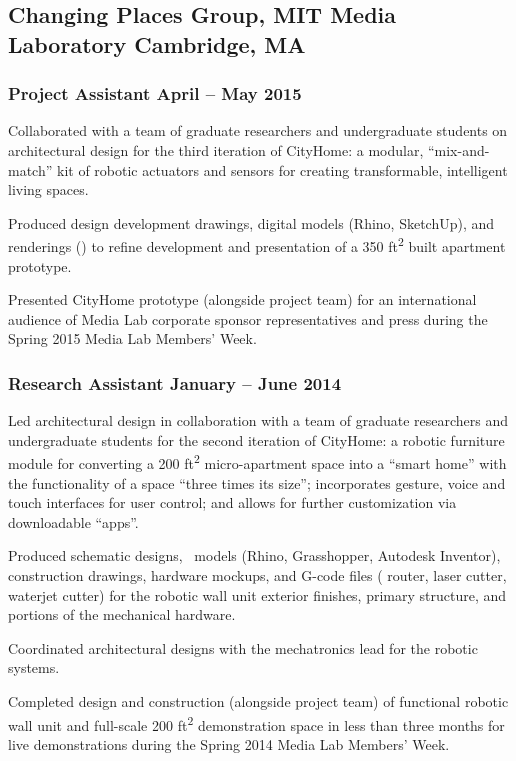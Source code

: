 \documentclass[letterpaper, oneside, 10pt]{article}
\begin{document}
\subsection*{Changing Places Group, MIT Media Laboratory\DotSep{0.25em} Cambridge, MA}

\subsubsection*{Project Assistant\DotSep{0.25em} April -- May 2015}

Collaborated with a team of graduate researchers and undergraduate
students on architectural design for the third iteration of CityHome: a
modular, ``mix-and-match'' kit of robotic actuators and sensors for
creating transformable, intelligent living spaces.

Produced design development drawings, digital models (Rhino, SketchUp),
and renderings (\kern-0.5pt) to refine development and
presentation of a 350 ft\textsuperscript{2} built apartment prototype.

Presented CityHome prototype (alongside project team) for an international
audience of Media Lab corporate sponsor representatives and press during
the Spring 2015  Media Lab Members’ Week.


\subsubsection*{Research Assistant\DotSep{0.25em} January -- June 2014}

Led architectural design in collaboration with a team of graduate
researchers and undergraduate students for the second iteration of
CityHome: a robotic furniture module for converting a 200
ft\textsuperscript{2} micro-apartment space into a ``smart home'' with the
functionality of a space ``three times its size''; incorporates gesture,
voice and touch interfaces for user control; and allows for further
customization via downloadable ``apps''.

Produced schematic designs, \ models (Rhino, Grasshopper, Autodesk
Inventor), construction drawings, hardware mockups, and G-code files
( router, laser cutter, waterjet cutter) for the robotic
wall unit exterior finishes, primary structure, and portions of the
mechanical hardware.

Coordinated architectural designs with the mechatronics lead for the
robotic systems.

Completed design and construction (alongside project team) of functional
robotic wall unit and full-scale 200 ft\textsuperscript{2} demonstration
space in less than three months for live demonstrations during the Spring
2014  Media Lab Members’ Week.
\end{document}

